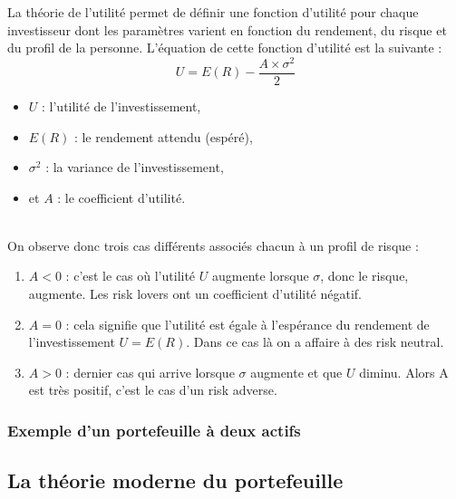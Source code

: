 La théorie de l'utilité permet de définir une fonction d'utilité pour chaque investisseur dont les paramètres varient en fonction du rendement, du risque et du profil de la personne. L'équation de cette fonction d'utilité est la suivante :
\[U = E(R) - \frac{A \times \sigma^2}{2} \]
\begin{itemize}
 \item $U$ : l'utilité de l'investissement,
 \item $E(R)$ : le rendement attendu (espéré),
 \item $\sigma^2$ : la variance de l'investissement,
 \item et $A$ : le coefficient d'utilité.
\end{itemize}

~\\ On observe donc trois cas différents associés chacun à un profil de risque :
\begin{enumerate}
 \item $A < 0$ : c'est le cas où l'utilité $U$ augmente lorsque $\sigma$, donc le risque, augmente. Les risk lovers ont un coefficient d'utilité négatif.
 \item $A = 0$ : cela signifie que l'utilité est égale à l'espérance du rendement de l'investissement $U = E(R)$. Dans ce cas là on a affaire à des risk neutral.
 \item $A > 0$ : dernier cas qui arrive lorsque $\sigma$ augmente et que $U$ diminu. Alors A est très positif, c'est le cas d'un risk adverse.
\end{enumerate}

\subsubsection{Exemple d'un portefeuille à deux actifs}







\subsection{La théorie moderne du portefeuille}
